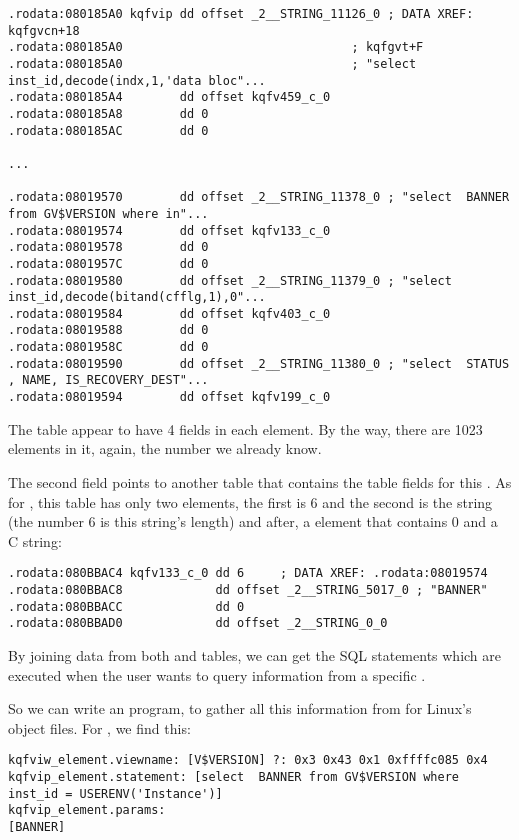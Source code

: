 \begin{lstlisting}[caption=kqf.o]
.rodata:080185A0 kqfvip dd offset _2__STRING_11126_0 ; DATA XREF: kqfgvcn+18
.rodata:080185A0                                ; kqfgvt+F
.rodata:080185A0                                ; "select inst_id,decode(indx,1,'data bloc"...
.rodata:080185A4        dd offset kqfv459_c_0
.rodata:080185A8        dd 0
.rodata:080185AC        dd 0

...

.rodata:08019570        dd offset _2__STRING_11378_0 ; "select  BANNER from GV$VERSION where in"...
.rodata:08019574        dd offset kqfv133_c_0
.rodata:08019578        dd 0
.rodata:0801957C        dd 0
.rodata:08019580        dd offset _2__STRING_11379_0 ; "select inst_id,decode(bitand(cfflg,1),0"...
.rodata:08019584        dd offset kqfv403_c_0
.rodata:08019588        dd 0
.rodata:0801958C        dd 0
.rodata:08019590        dd offset _2__STRING_11380_0 ; "select  STATUS , NAME, IS_RECOVERY_DEST"...
.rodata:08019594        dd offset kqfv199_c_0
\end{lstlisting}


The table appear to have 4 fields in each element. By the way, there are 1023 elements in it, again, the number we already know.

The second field points to another table that contains the table fields for this .
As for , this table has only two elements, the first is 6 and the second is 
the  string (the number 6 is this string's length) and after, a  element that contains 
0 and a  C string:

\begin{lstlisting}[caption=kqf.o]
.rodata:080BBAC4 kqfv133_c_0 dd 6     ; DATA XREF: .rodata:08019574
.rodata:080BBAC8             dd offset _2__STRING_5017_0 ; "BANNER"
.rodata:080BBACC             dd 0
.rodata:080BBAD0             dd offset _2__STRING_0_0
\end{lstlisting}

By joining data from both  and  tables, we can get the SQL statements which are executed when the user wants to query information from a specific .

So we can write an \oracletables program, to gather all this information from \oracle for Linux's object files.
For , we find this:

\begin{lstlisting}[caption=Result of \OracleTablesName]
kqfviw_element.viewname: [V$VERSION] ?: 0x3 0x43 0x1 0xffffc085 0x4
kqfvip_element.statement: [select  BANNER from GV$VERSION where inst_id = USERENV('Instance')]
kqfvip_element.params:
[BANNER] 
\end{lstlisting}

